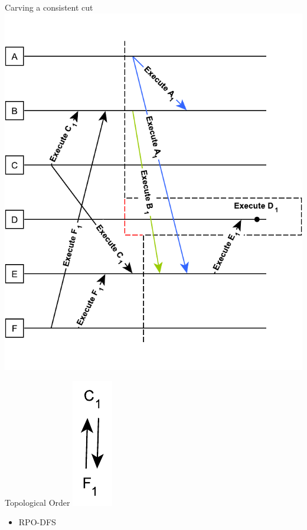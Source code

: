 \documentclass{beamer}
\begin{document}
\begin{frame}{Carving a consistent cut}    
	\centering
    \includegraphics[scale=0.6]{figures/consistent-cut.pdf}
\end{frame}

\begin{frame}{Topological Order}
    \centering
    \includegraphics[scale=0.7]{figures/cut-graph.pdf}
    \vspace{\fill}
    \begin{itemize}
    	\item RPO-DFS
    \end{itemize}
\end{frame}
\end{document}

